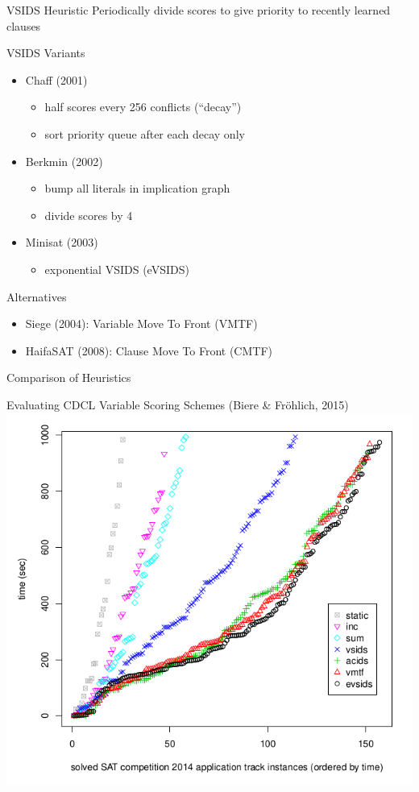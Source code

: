 \documentclass[t]{sdqbeamer}
\begin{document}
    
    \begin{frame}{VSIDS Heuristic}
    Periodically divide scores to give priority to recently learned clauses
    \begin{exampleblock}{VSIDS Variants}
    \begin{itemize}
      \item Chaff (2001)
      \begin{itemize}
      \item half scores every 256 conflicts (``decay'')
      \item sort priority queue after each decay only
      \end{itemize}
      
      \item Berkmin (2002) 
      \begin{itemize}
      \item bump all literals in implication graph
      \item divide scores by 4
      \end{itemize}
      
      \item Minisat (2003)
      \begin{itemize}
      \item {\color{myblue} exponential VSIDS} (eVSIDS)
      \end{itemize}
    \end{itemize}
    \end{exampleblock}
    
    \begin{block}{Alternatives}
      \begin{itemize}
          \item Siege (2004): Variable Move To Front (VMTF)
        \item HaifaSAT (2008): Clause Move To Front (CMTF)
      \end{itemize}
    \end{block}
    \end{frame}
    
\begin{frame}{Comparison of Heuristics}%
\begin{block}{Evaluating CDCL Variable Scoring Schemes (Biere \& Fröhlich, 2015)}
    \centering
    \includegraphics[width=.6\linewidth]{figures/l06/evsids-vmtf-acids-froehlich2015.png}
\end{block}
\end{frame}
    
\end{document}
